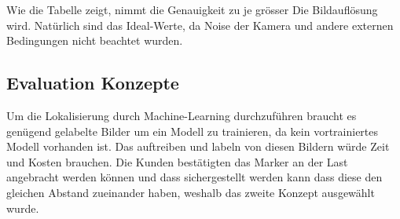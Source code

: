 Wie die Tabelle zeigt, nimmt die Genauigkeit zu je grösser Die Bildauflösung wird. 
Natürlich sind das Ideal-Werte, da Noise der Kamera und andere externen Bedingungen nicht beachtet wurden. 

\subsection{Evaluation Konzepte}
Um die Lokalisierung durch Machine-Learning durchzuführen braucht es genügend gelabelte Bilder um ein Modell zu trainieren, da kein vortrainiertes Modell vorhanden ist. Das auftreiben und labeln von diesen Bildern würde Zeit und Kosten brauchen. Die Kunden bestätigten das Marker an der Last angebracht werden können und dass sichergestellt werden kann dass diese den gleichen Abstand zueinander haben, weshalb das zweite Konzept ausgewählt wurde.
